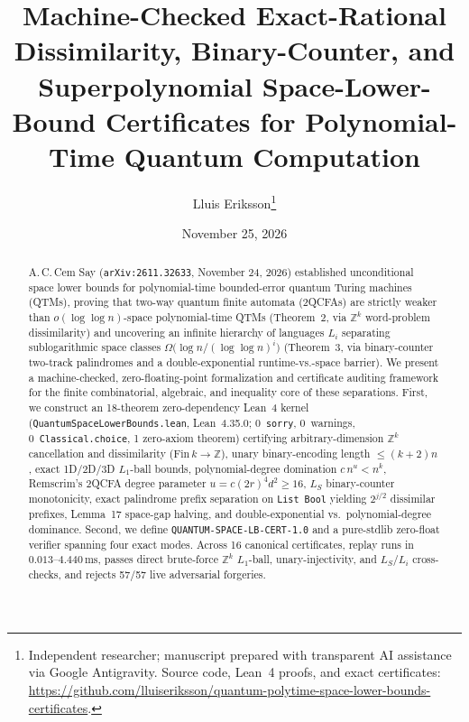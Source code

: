 \documentclass[11pt,twocolumn]{article}
\title{\textbf{Machine-Checked Exact-Rational Dissimilarity, Binary-Counter, and Superpolynomial Space-Lower-Bound Certificates for Polynomial-Time Quantum Computation}}
\author{Lluis Eriksson\thanks{Independent researcher; manuscript prepared with transparent AI assistance via Google Antigravity. Source code, Lean~4 proofs, and exact certificates: \url{https://github.com/lluiseriksson/quantum-polytime-space-lower-bounds-certificates}.}}
\date{November 25, 2026}
\newcommand{\ZZ}{\mathbb{Z}}
\begin{document}
\maketitle

\begin{abstract}
A.\,C.\,Cem Say (\texttt{arXiv:2611.32633}, November 24, 2026) established unconditional space lower bounds for polynomial-time bounded-error quantum Turing machines (QTMs), proving that two-way quantum finite automata (2QCFAs) are strictly weaker than $o(\log\log n)$-space polynomial-time QTMs (Theorem~2, via $\ZZ^k$ word-problem dissimilarity) and uncovering an infinite hierarchy of languages $L_i$ separating sublogarithmic space classes $\Omega\!\bigl(\log n / (\log\log n)^i\bigr)$ (Theorem~3, via binary-counter two-track palindromes and a double-exponential runtime-vs.-space barrier). We present a machine-checked, zero-floating-point formalization and certificate auditing framework for the finite combinatorial, algebraic, and inequality core of these separations. First, we construct an 18-theorem zero-dependency Lean~4 kernel (\texttt{QuantumSpaceLowerBounds.lean}, Lean~4.35.0; 0~\texttt{sorry}, 0~warnings, 0~\texttt{Classical.choice}, 1 zero-axiom theorem) certifying arbitrary-dimension $\ZZ^k$ cancellation and dissimilarity ($\mathrm{Fin}\,k \to \ZZ$), unary binary-encoding length $\le (k+2)n$, exact 1D/2D/3D $L_1$-ball bounds, polynomial-degree domination $c\,n^u < n^k$, Remscrim's 2QCFA degree parameter $u = c(2r)^4 d^2 \ge 16$, $L_S$ binary-counter monotonicity, exact palindrome prefix separation on \texttt{List Bool} yielding $2^{j/2}$ dissimilar prefixes, Lemma~17 space-gap halving, and double-exponential vs.\ polynomial-degree dominance. Second, we define \texttt{QUANTUM-SPACE-LB-CERT-1.0} and a pure-stdlib zero-float verifier spanning four exact modes. Across 16 canonical certificates, replay runs in $0.013$--$4.440\,\mathrm{ms}$, passes direct brute-force $\ZZ^k$ $L_1$-ball, unary-injectivity, and $L_S$/$L_i$ cross-checks, and rejects 57/57 live adversarial forgeries.
\end{abstract}
\end{document}
